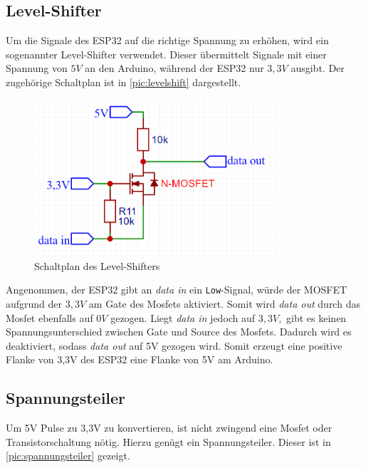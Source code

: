 \subsection{Level-Shifter}
Um die Signale des ESP32 auf die richtige Spannung zu erhöhen, wird ein sogenannter Level-Shifter verwendet. Dieser übermittelt Signale mit einer Spannung von $ 5V $ an den Arduino, während der ESP32 nur $ 3,3V $ ausgibt.
Der zugehörige Schaltplan ist in \autoref{pic:levelshift} dargestellt.
\vspace{1cm}

\begin{figure}[h]
	\begin{center}
		\includegraphics[width=9cm]{levelShifter.PNG}
		\caption{\label{pic:levelshift}Schaltplan des Level-Shifters}
	\end{center}
\end{figure}

Angenommen, der ESP32 gibt an \textit{data in} ein \texttt{Low}-Signal, würde der MOSFET aufgrund der $ 3,3V $ am Gate des Mosfets aktiviert. Somit wird \textit{data out} durch das Mosfet ebenfalls auf $ 0V $ gezogen. 
Liegt \textit{data in} jedoch auf $ 3,3V, $ gibt es keinen Spannungsunterschied zwischen Gate und Source des Mosfets. Dadurch wird es deaktiviert, sodass \textit{data out} auf 5V gezogen wird. 
Somit erzeugt eine positive Flanke von 3,3V des ESP32 eine Flanke von 5V am Arduino.

\subsection{Spannungsteiler}
Um 5V Pulse zu 3,3V zu konvertieren, ist nicht zwingend eine Mosfet oder Transistorschaltung nötig. Hierzu genügt ein Spannungsteiler. Dieser ist in \autoref{pic:spannungsteiler} gezeigt.

